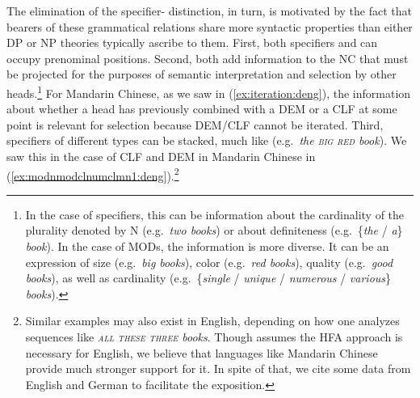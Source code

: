 \documentclass[output=paper,colorlinks,citecolor=brown]{langscibook}
\begin{document}
%
%
%

The elimination of the specifier- distinction, in turn, is motivated by the fact that bearers of these grammatical relations share  more syntactic properties than either DP or NP theories typically ascribe to them. First, both specifiers and  can occupy prenominal positions. Second, both add information to the NC that must be projected  for the purposes of semantic interpretation and selection by other heads.\footnote{In the case of specifiers, this can be information about the cardinality of the plurality denoted by N (e.g.\ \textit{two books}) or about definiteness (e.g.\ \{\textit{the} / \textit{a}\}  \textit{book}). In the case of MODs, the information is more diverse. It can be an expression of  size  (e.g.\ \textit{big books}), color  (e.g.\ \textit{red books}), quality (e.g.\ \textit{good books}), as well as cardinality (e.g.\ \{\textit{single} / \textit{unique} / \textit{numerous} / \textit{various}\} \textit{books}).} For Mandarin Chinese, as we saw in (\ref{ex:iteration:deng}), the information about whether a head has previously combined with a DEM or a CLF at some point is relevant for selection because DEM/CLF cannot be iterated. Third, specifiers of different types can be stacked, much like  (e.g.\ \textit{the \textsc{big} \textsc{red} book}).  We saw this in the case of CLF and DEM in Mandarin Chinese in (\ref{ex:modnmodclnumclmn1:deng}).\footnote{Similar examples may also exist in English, depending on how one analyzes sequences like  \textit{\textsc{all} \textsc{these} \textsc{three} books}. Though \citet{VanEynde06a} assumes the HFA approach is necessary for English, we believe that languages like Mandarin Chinese provide much stronger support for it. In spite of that, we cite some data from English and German to facilitate the exposition.} %
\end{document}
